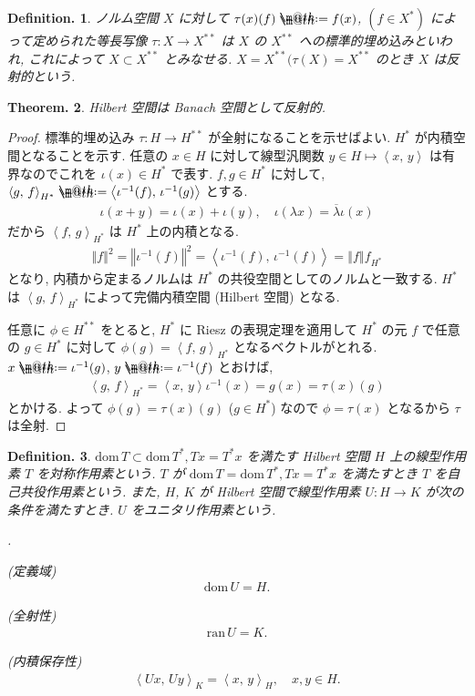 \documentclass[openany, a4paper, oneside]{jsbook}
\makeatletter
\newcounter{enum2}
\renewenvironment{enumerate}{%
\begin{list}%
{%
\arabic{enum2}.\ \,%
}%
{%
\usecounter{enum2}
\setlength{\itemindent}{0pt}%
\setlength{\leftmargin}{15pt}%
\setlength{\rightmargin}{0pt}%
\setlength{\labelsep}{0pt}%
\setlength{\labelwidth}{6pt}%
\setlength{\itemsep}{0pt}%
\setlength{\parsep}{0pt}%
\setlength{\listparindent}{0pt}%
}
}{%
\end{list}%
}
\newcommand*{\defeq}{\mathrel{\rlap{%
\raisebox{0.3ex}{$\m@th\cdot$}}%
\raisebox{-0.3ex}{$\m@th\cdot$}}%
=}
\newcommand{\dom}{\mathrm{dom}\,}
\newcommand{\ran}{\mathrm{ran}\,}
\theoremstyle{break}
\newtheorem{thm}{Theorem.}[section]
\theoremstyle{breakdefn}
\newtheorem{defn}[thm]{Definition.}
\newcommand{\norm}[1]{\left\Vert#1\right\Vert}
\newcommand{\bkt}[2]{\left\langle#1,\,#2\right\rangle}
\makeatother
\begin{document}
\begin{defn}
ノルム空間 $X$ に対して $\tau (x) (f) \defeq f (x)$, $(f\in X^*)$ によって定められた等長写像
$\tau \colon X \to X^{**}$ は $X$ の $X^{**}$ への標準的埋め込みといわれ,
これによって $X \subset X^{**}$ とみなせる.
$X = X^{**} (\tau (X) = X^{**}$ のとき $X$ は反射的という.
\end{defn}
\begin{thm}
 Hilbert 空間は Banach 空間として反射的.
\end{thm}
\begin{proof}
標準的埋め込み $\tau \colon H \to H^{**}$ が全射になることを示せばよい.
$H^*$ が内積空間となることを示す.
任意の $x \in H$ に対して線型汎関数 $y \in H \mapsto \bkt{x}{y}$ は有界なのでこれを
$\iota (x) \in H^*$ で表す.
$f, g \in H^*$ に対して, $\bkt{g}{f}_{H^*} \defeq \bkt{\iota^{-1}(f)}{\iota^{-1}(g)}$ とする.
\begin{align}
 \iota (x + y)
 =
 \iota (x) + \iota (y), \quad
 \iota (\lambda x)
 =
 \overline{\lambda} \iota (x)
\end{align}
だから $\bkt{f}{g}_{H^*}$ は $H^*$ 上の内積となる.
\begin{align}
 \norm{f}^2
 =
 \norm{\iota^{-1}(f)}^2
 =
 \bkt{\iota^{-1}(f)}{\iota^{-1}(f)}
 =
 \norm{f}{f}_{H^*}
\end{align}
となり, 内積から定まるノルムは $H^*$ の共役空間としてのノルムと一致する.
$H^*$ は $\bkt{g}{f}_{H^*}$ によって完備内積空間 (Hilbert 空間) となる.

任意に $\phi \in H^{**}$ をとると, $H^*$ に Riesz の表現定理を適用して
$H^*$ の元 $f$ で任意の $g \in H^*$ に対して $\phi (g) = \bkt{f}{g}_{H^*}$ となるベクトルがとれる.
$x \defeq \iota^{-1}(g)$, $y \defeq \iota^{-1}(f)$ とおけば,
\begin{align}
 \bkt{g}{f}_{H^*}
 =
 \bkt{x}{y} \iota^{-1}(x)
 =
 g(x)
 =
 \tau (x) (g)
\end{align}
とかける.
よって $\phi (g) = \tau (x) (g)$ ($g \in H^*$) なので $\phi = \tau (x)$ となるから $\tau$ は全射.
\end{proof}

\begin{defn}
 $\dom T \subset \dom T^*, Tx = T^*x$ を満たす Hilbert 空間 $H$ 上の線型作用素 $T$ を対称作用素という.
 $T$ が $\dom T = \dom T^*, Tx = T^*x$ を満たすとき $T$ を自己共役作用素という.
 また, $H$, $K$ が Hilbert 空間で線型作用素 $U \colon H \to K$ が次の条件を満たすとき. $U$ をユニタリ作用素という.
\begin{enumerate}
\item \textup{(定義域)}
   \begin{align}
    \dom U = H.
   \end{align}
\item \textup{(全射性)}
   \begin{align}
    \ran U
    =
    K.
   \end{align}
\item \textup{(内積保存性)}
   \begin{align}
    \bkt{Ux}{Uy}_{K}
    =
    \bkt{x}{y}_{H}, \quad x, y \in H.
   \end{align}
\end{enumerate}
\end{defn}
\end{document}
